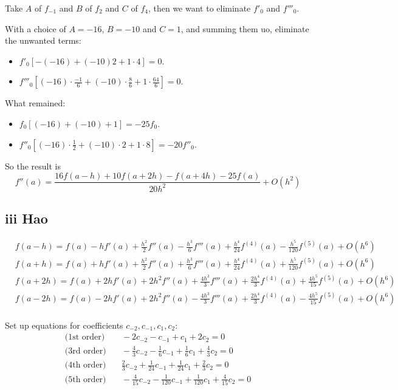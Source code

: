 \documentclass{article}
\begin{document}
Take $A$ of $f_{-1}$ and $B$ of $f_{2}$ and $C$ of $f_4$,
then we want to eliminate $f'_0$ and $f'''_0$.

With a choice of $A=-16$, $B=-10$ and $C=1$, and summing them uo, eliminate the unwanted terms:
\begin{itemize}
    \item $f'_0 [-(-16) + (-10)2 + 1\cdot 4] = 0$.
    \item $f'''_0 [(-16)\cdot \frac{-1}{6} + (-10)\cdot \frac{8}{6} + 1\cdot \frac{64}{6}] = 0$.
\end{itemize}
What remained:
\begin{itemize}
    \item $f_0 [(-16) + (-10) + 1] = -25f_0$.
    \item $f''_0 [(-16)\cdot \frac{1}{2} + (-10)\cdot 2 + 1\cdot 8] = -20f''_0$.
\end{itemize}

So the result is
\[f''\left( a \right)=\frac{16f\left( a-h \right)+10f\left( a+2h \right)-f\left( a+4h \right)-25f\left( a \right)}{20{{h}^{2}}}+O\left( {{h}^{2}} \right)\]
\subsection{iii Hao}
\begin{align}
 & f(a-h) = f(a) - hf'(a) + \frac{h^2}{2}f''(a) - \frac{h^3}{6}f'''(a) + \frac{h^4}{24}f^{(4)}(a) - \frac{h^5}{120}f^{(5)}(a) + O(h^6) \\
 & f(a+h) = f(a) + hf'(a) + \frac{h^2}{2}f''(a) + \frac{h^3}{6}f'''(a) + \frac{h^4}{24}f^{(4)}(a) + \frac{h^5}{120}f^{(5)}(a) + O(h^6) \\
 & f(a+2h) = f(a) + 2hf'(a) + 2h^2f''(a) + \frac{4h^3}{3}f'''(a) + \frac{2h^4}{3}f^{(4)}(a) + \frac{4h^5}{15}f^{(5)}(a) + O(h^6) \\
 & f(a-2h) = f(a) - 2hf'(a) + 2h^2f''(a) - \frac{4h^3}{3}f'''(a) + \frac{2h^4}{3}f^{(4)}(a) - \frac{4h^5}{15}f^{(5)}(a) + O(h^6) \\
\end{align}

Set up equations for coefficients $c_{-2}, c_{-1}, c_1, c_2$:
\begin{align}
\text{(1st order)} & \quad -2c_{-2} - c_{-1} + c_1 + 2c_2 = 0 \\
\text{(3rd order)} & \quad -\frac{4}{3}c_{-2} - \frac{1}{6}c_{-1} + \frac{1}{6}c_1 + \frac{4}{3}c_2 = 0 \\
\text{(4th order)} & \quad \frac{2}{3}c_{-2} + \frac{1}{24}c_{-1} + \frac{1}{24}c_1 + \frac{2}{3}c_2 = 0 \\
\text{(5th order)} & \quad -\frac{4}{15}c_{-2} - \frac{1}{120}c_{-1} + \frac{1}{120}c_1 + \frac{4}{15}c_2 = 0 \\
\end{align}
\end{document}
